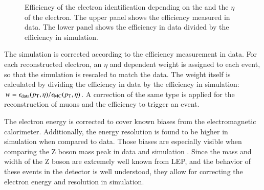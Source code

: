 \begin{figure}[htbp!]
  \begin{center}
\caption{Efficiency of the electron identification depending on the \pt and the $\eta$ of the electron\cite{CMS-DP-2017-004}.
         The upper panel shows the efficiency measured in data. The lower panel shows the efficiency in data divided by the efficiency in simulation. 
  \label{fig:reco_eleeff}}
  \end{center}
\end{figure}

The simulation is corrected according to the efficiency measurement in data. For each reconstructed electron, an $\eta$ and \pt dependent weight is assigned to each event,
so that the simulation is rescaled to match the data. The weight itself is calculated by dividing the efficiency in data by the efficiency in simulation: $w = \epsilon_{\mathrm{data}} (p_{\mathrm{T}},\eta) /\epsilon_{\mathrm{MC}} (p_{\mathrm{T}},\eta)$.
A correction of the same type is applied for the reconstruction of muons and the efficiency to trigger an event.

The electron energy is corrected to cover known biases from the electromagnetic calorimeter. Additionally, the energy resolution is found to be higher in simulation when compared to data.
Those biases are especially visible when comparing the Z boson mass peak in data and simulation \cite{CMS-DP-2016-026}.
Since the mass and width of the Z boson are extremely well known from LEP, and the behavior of these events in the detector is well understood, they allow for correcting the electron energy and resolution in simulation.

